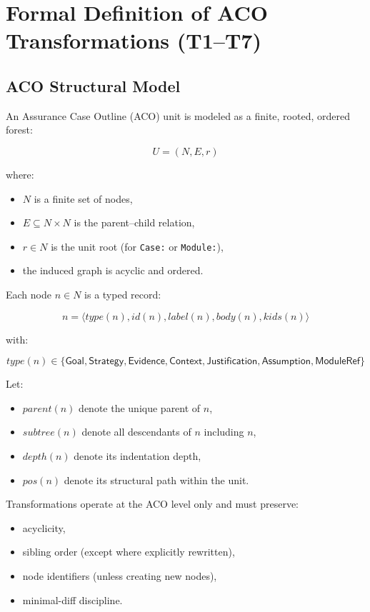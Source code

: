 \documentclass[12pt,twoside,a4paper]{article}
\begin{document}
\section{Formal Definition of ACO Transformations (T1--T7)}\label{sec:formal_def}

\subsection{ACO Structural Model}

An Assurance Case Outline (ACO) unit is modeled as a finite, rooted, ordered forest:

\[
U = (N, E, r)
\]

where:

\begin{itemize}
  \item $N$ is a finite set of nodes,
  \item $E \subseteq N \times N$ is the parent--child relation,
  \item $r \in N$ is the unit root (for \texttt{Case:} or \texttt{Module:}),
  \item the induced graph is acyclic and ordered.
\end{itemize}

Each node $n \in N$ is a typed record:

\[
n = \langle type(n), id(n), label(n), body(n), kids(n) \rangle
\]

with:

\[
type(n) \in 
\{\mathsf{Goal}, \mathsf{Strategy}, \mathsf{Evidence}, 
\mathsf{Context}, \mathsf{Justification}, 
\mathsf{Assumption}, \mathsf{ModuleRef}\}
\]

Let:

\begin{itemize}
  \item $parent(n)$ denote the unique parent of $n$,
  \item $subtree(n)$ denote all descendants of $n$ including $n$,
  \item $depth(n)$ denote its indentation depth,
  \item $pos(n)$ denote its structural path within the unit.
\end{itemize}

Transformations operate at the ACO level only and must preserve:

\begin{itemize}
  \item acyclicity,
  \item sibling order (except where explicitly rewritten),
  \item node identifiers (unless creating new nodes),
  \item minimal-diff discipline.
\end{itemize}
\end{document}
